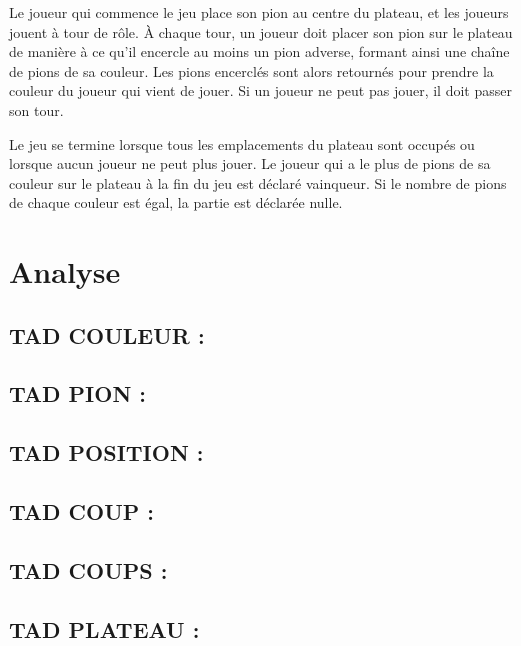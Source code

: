 \documentclass{article}
\begin{document}
\vspace{5mm}

Le joueur qui commence le jeu place son pion au centre du plateau, et les joueurs jouent à tour de rôle. À chaque tour, un joueur doit placer son pion sur le plateau de manière à ce qu'il encercle au moins un pion adverse, formant ainsi une chaîne de pions de sa couleur. Les pions encerclés sont alors retournés pour prendre la couleur du joueur qui vient de jouer. Si un joueur ne peut pas jouer, il doit passer son tour.

\vspace{5mm}

Le jeu se termine lorsque tous les emplacements du plateau sont occupés ou lorsque aucun joueur ne peut plus jouer. Le joueur qui a le plus de pions de sa couleur sur le plateau à la fin du jeu est déclaré vainqueur. Si le nombre de pions de chaque couleur est égal, la partie est déclarée nulle.

\newpage

\section{Analyse}

\subsection{TAD COULEUR :}


\subsection{TAD PION :}


\subsection{TAD POSITION :}


\subsection{TAD COUP :}


\subsection{TAD COUPS :}


\subsection{TAD PLATEAU :}

\end{document}
